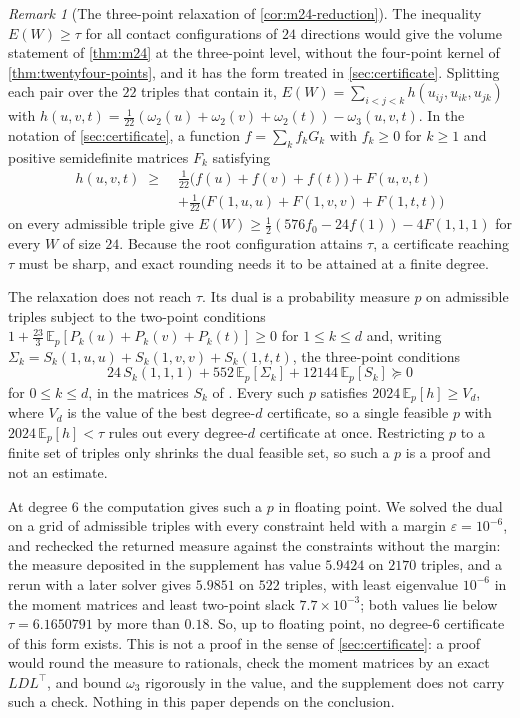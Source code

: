 \documentclass[11pt,reqno]{amsart}
\renewcommand{\_}{\origunderscore\allowbreak}
\numberwithin{equation}{section}
\theoremstyle{plain}
\theoremstyle{definition}
\theoremstyle{remark}
\newtheorem{remark}[thm]{Remark}
\begin{document}
\begin{remark}[The three-point relaxation of \cref{cor:m24-reduction}]\label{rem:m24-three-point}
The inequality $E(W)\ge\tau$ for all contact configurations of $24$
directions would give the volume statement of \cref{thm:m24} at the three-point
level, without the four-point kernel of \cref{thm:twentyfour-points},
and it has the form treated in \cref{sec:certificate}.
Splitting each pair over the $22$ triples that contain it,
$E(W)=\sum_{i<j<k}h(u_{ij},u_{ik},u_{jk})$ with
$h(u,v,t)=\tfrac1{22}(\omega_2(u)+\omega_2(v)+\omega_2(t))-\omega_3(u,v,t)$.
In the notation of \cref{sec:certificate}, a function
$f=\sum_kf_kG_k$ with $f_k\ge0$ for $k\ge1$ and positive semidefinite
matrices $F_k$ satisfying
\begin{align*}
  h(u,v,t)\;\ge\;&\tfrac1{22}\bigl(f(u)+f(v)+f(t)\bigr)+F(u,v,t)\\
  &+\tfrac1{22}\bigl(F(1,u,u)+F(1,v,v)+F(1,t,t)\bigr)
\end{align*}
on every admissible triple give $E(W)\ge\tfrac12(576f_0-24f(1))-4F(1,1,1)$
for every $W$ of size $24$. Because the root configuration attains $\tau$,
a certificate reaching $\tau$ must be sharp, and exact rounding needs it
to be attained at a finite degree.

The relaxation does not reach $\tau$. Its dual is a probability
measure $p$ on admissible triples subject to the two-point conditions
$1+\tfrac{23}{3}\,\mathbb{E}_p[P_k(u)+P_k(v)+P_k(t)]\ge0$ for
$1\le k\le d$ and, writing
$\Sigma_k=S_k(1,u,u)+S_k(1,v,v)+S_k(1,t,t)$, the three-point conditions
\[
  24\,S_k(1,1,1)+552\,\mathbb{E}_p[\Sigma_k]
  +12144\,\mathbb{E}_p[S_k]\succeq0
\]
for $0\le k\le d$, in the matrices $S_k$ of \cite{BV08}. Every such $p$
satisfies $2024\,\mathbb{E}_p[h]\ge V_d$, where $V_d$ is the value of the
best degree-$d$ certificate, so a single feasible $p$ with
$2024\,\mathbb{E}_p[h]<\tau$ rules out every degree-$d$ certificate at
once. Restricting $p$ to a finite set of triples only shrinks the dual
feasible set, so such a $p$ is a proof and not an estimate.

At degree $6$ the computation gives such a $p$ in floating point. We
solved the dual on a grid
of admissible triples with every constraint held with a margin
$\varepsilon=10^{-6}$, and rechecked the returned measure against the
constraints without the margin: the measure deposited in the supplement
has value $5.9424$ on $2170$ triples, and a rerun with a later solver
gives $5.9851$ on $522$ triples, with least eigenvalue $10^{-6}$ in the
moment matrices and least two-point slack $7.7\times10^{-3}$; both values
lie below $\tau=6.1650791$ by more than $0.18$. So, up to floating
point, no degree-$6$ certificate of this form exists. This is not a proof
in the sense of \cref{sec:certificate}: a proof would round the measure to
rationals, check the moment matrices by an exact $LDL^\top$, and bound
$\omega_3$ rigorously in the value, and the supplement does not carry
such a check. Nothing in this paper depends on the conclusion.


\end{remark}
\end{document}
